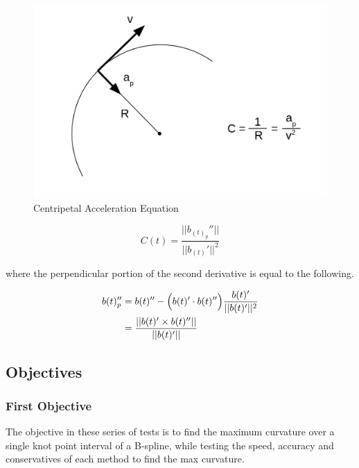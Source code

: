 \documentclass{article}
\begin{document}
\begin{figure}[h]
\begin{center}
\includegraphics[scale=.23]{Centripetal_Acceleration.png}
\end{center}
\caption{Centripetal Acceleration Equation}
\label{Fig:Centripetal_Acceleration}
\end{figure}

\begin{equation} \label{eq:curvature using centripetal}
    C(t) = \frac{||b_{(t)}_p''||}{||b_{(t)}'||^2}
\end{equation}

where the perpendicular portion of the second derivative is equal to the following.

\begin{equation}
\begin{aligned}
    b(t)_p'' &= b(t)'' -  \Bigl(b(t)' \cdot b(t)''\Bigl) \frac{b(t)'}{||b(t)'||^2} \\
    &= \frac{||b(t)' \times b(t)''||} {||b(t)'||}
\end{aligned}
\end{equation}

\subsection{Objectives}

\subsubsection{First Objective}

The objective in these series of tests is to find the maximum curvature over a single knot point interval of a B-spline, while testing the speed, accuracy and conservatives of each method to find the max curvature.
\end{document}
